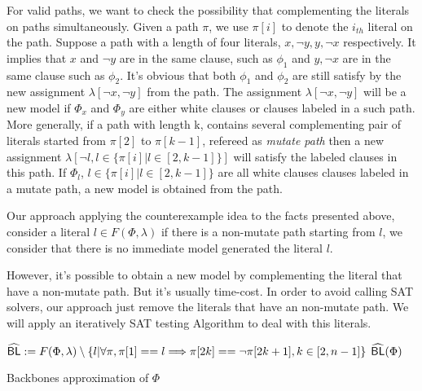  For valid paths, we want to check the possibility that complementing the literals on paths simultaneously. Given a path $\pi$, we use $\pi[i]$ to denote the $i_{th}$ literal on the path. Suppose a path with a length of four literals, $x, \neg y, y, \neg x$ respectively. It implies that $x$ and $\neg y$ are in the same clause, such as $\phi_1$ and $y, \neg x$ are in the same clause such as $\phi_2$. It's obvious that both $\phi_1$ and $\phi_2$ are still satisfy by the new assignment $\lambda[\neg x, \neg y]$ from the path. The assignment $\lambda[\neg x, \neg y]$ will be a new model if $\Phi_x$ and $\Phi_y$ are either white clauses or clauses labeled in a such path. More generally, if a path with length k, contains several complementing pair of literals started from $\pi[2]$ to $\pi[k-1]$, refereed as \emph{mutate path} then a new assignment $\lambda[\neg l, l\in\{\pi[i] | l\in[2, k-1]\}]$ will satisfy the labeled clauses in this path. If $\Phi_l$, $l\in\{\pi[i] | l\in[2, k-1]\}$ are all white clauses clauses labeled in a mutate path, a new model is obtained from the path. 
 
 Our approach applying the counterexample idea to the facts presented above, consider a literal $l\in F(\Phi, \lambda)$ if there is a non-mutate path starting from $l$, we consider that there is no immediate model generated the literal $l$.
 
 However, it's possible to obtain a new model by complementing the literal that have a non-mutate path. But it's usually time-cost. In order to avoid calling SAT solvers, our approach just remove the literals that have an non-mutate path. We will apply an iteratively SAT testing Algorithm to deal with this literals.


\begin{algorithm}
\SetAlgoShortEnd
\SetFillComment
{}

${\sf \widehat{BL}}:=F(\Phi, \lambda)\setminus\{l | \forall \pi, \pi[1]==l\Longrightarrow\pi[2k]==\neg\pi[2k+1], k\in[2,n-1]\}$\;
\Return ${\sf \widehat{BL}}(\Phi)$\;
\caption{Backbones approximation of $\Phi$}
\label{alg:nBLo}
\end{algorithm}

